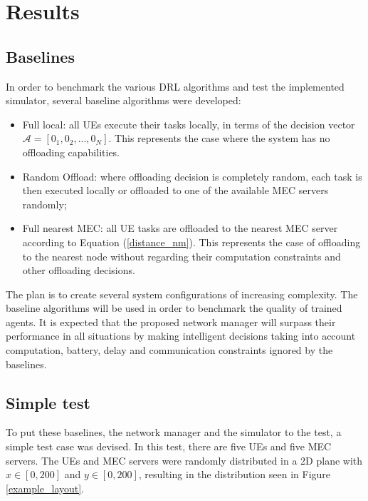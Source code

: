 \chapter{Results}

\section{Baselines}
\noindent In order to benchmark the various \acrshort{DRL} algorithms and test the implemented simulator, several baseline algorithms were developed:

\begin{itemize}
    \item Full local: all \acrshort{UE}s execute their tasks locally, in terms of the decision vector $\mathcal{A}=[0_1, 0_2, ..., 0_N]$. This represents the case where the system has no offloading capabilities.
    \item Random Offload: where offloading decision is completely random, each task is then executed locally or offloaded to one of the available \acrshort{MEC} servers randomly;
    \item Full nearest \acrshort{MEC}: all \acrshort{UE} tasks are offloaded to the nearest \acrshort{MEC} server according to Equation (\ref{distance_nm}). This represents the case of offloading to the nearest node without regarding their computation constraints and other offloading decisions.
\end{itemize}

The plan is to create several system configurations of increasing complexity. The baseline algorithms will be used in order to benchmark the quality of trained agents. It is expected that the proposed network manager will surpass their performance in all situations by making intelligent decisions taking into account computation, battery, delay and communication constraints ignored by the baselines.

\section{Simple test}

To put these baselines, the network manager and the simulator to the test, a simple test case was devised. In this test, there are five \acrshort{UE}s and five \acrshort{MEC} servers. The UEs and MEC servers were randomly distributed in a 2D plane with $x \in [0, 200]$ and $y \in [0, 200]$, resulting in the distribution seen in Figure \ref{example_layout}.

